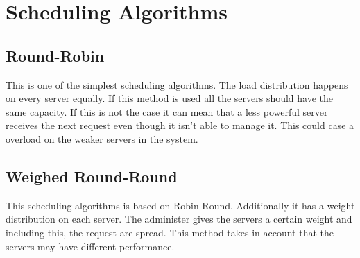 \documentclass[12p]{article}
\begin{document}
	
	\newpage
	\section{Scheduling Algorithms}
		
	\subsection{Round-Robin}
	This is one of the simplest scheduling algorithms. The load distribution happens on every server equally. If this method is used all the servers should have the same capacity. If this is not the case it can mean that a less powerful server receives the next request even though it isn't able to manage it. This could case a overload on the weaker servers in the system. 
	
	\subsection{Weighed Round-Round}
	This scheduling algorithms is based on Robin Round. Additionally it has a weight distribution on each server. The administer gives the servers a certain weight and including this, the request are spread. This method takes in account that the servers may have different performance. 
	
\end{document}
